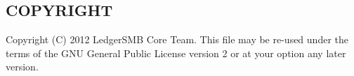 \subsection*{COPYRIGHT\label{LedgerSMB::ScriptLib::Common_Search_COPYRIGHT}}


Copyright (C) 2012 LedgerSMB Core Team.  This file may be re-used under the terms of the GNU General Public License version 2 or at your option any later version.

